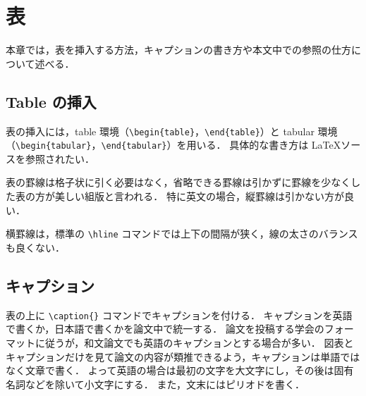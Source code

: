 \documentclass[uplatex, twocolumn, 9pt]{jsproceedings}
\begin{document}
\section{表}
本章では，表を挿入する方法，キャプションの書き方や本文中での参照の仕方について述べる．

\subsection{Table の挿入}
表の挿入には，table 環境（\verb*|\begin{table}|，\verb*|\end{table}|）と tabular 環境（\verb*|\begin{tabular}|，\verb*|\end{tabular}|）を用いる．
具体的な書き方は \LaTeX ソースを参照されたい．


表の罫線は格子状に引く必要はなく，省略できる罫線は引かずに罫線を少なくした表の方が美しい組版と言われる．
特に英文の場合，縦罫線は引かない方が良い．

横罫線は，標準の \verb*|\hline| コマンドでは上下の間隔が狭く，線の太さのバランスも良くない．

\subsection{キャプション}
表の上に \verb*|\caption{}| コマンドでキャプションを付ける．
キャプションを英語で書くか，日本語で書くかを論文中で統一する．
論文を投稿する学会のフォーマットに従うが，和文論文でも英語のキャプションとする場合が多い．
図表とキャプションだけを見て論文の内容が類推できるよう，キャプションは単語ではなく文章で書く．
よって英語の場合は最初の文字を大文字にし，その後は固有名詞などを除いて小文字にする．
また，文末にはピリオドを書く．
\end{document}
